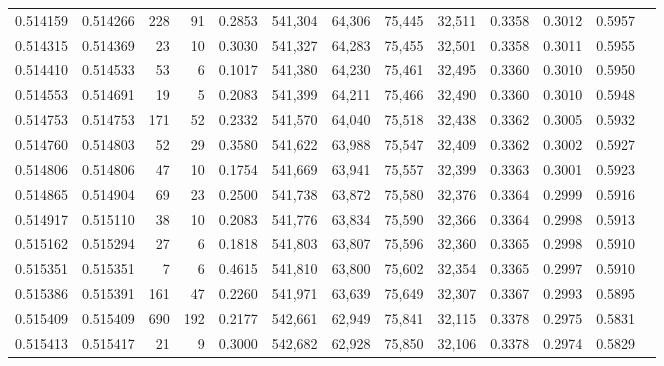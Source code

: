 \begin{tabular}{rrrrrrrrrrrrr}
0.514159 & 0.514266 &   228 &    91 &                                     0.2853 & 541,304 &  64,306 &  75,445 &  32,511 & 0.3358 & 0.3012 & 0.5957 \\
0.514315 & 0.514369 &    23 &    10 &                                     0.3030 & 541,327 &  64,283 &  75,455 &  32,501 & 0.3358 & 0.3011 & 0.5955 \\
0.514410 & 0.514533 &    53 &     6 &                                     0.1017 & 541,380 &  64,230 &  75,461 &  32,495 & 0.3360 & 0.3010 & 0.5950 \\
0.514553 & 0.514691 &    19 &     5 &                                     0.2083 & 541,399 &  64,211 &  75,466 &  32,490 & 0.3360 & 0.3010 & 0.5948 \\
0.514753 & 0.514753 &   171 &    52 &                                     0.2332 & 541,570 &  64,040 &  75,518 &  32,438 & 0.3362 & 0.3005 & 0.5932 \\
0.514760 & 0.514803 &    52 &    29 &                                     0.3580 & 541,622 &  63,988 &  75,547 &  32,409 & 0.3362 & 0.3002 & 0.5927 \\
0.514806 & 0.514806 &    47 &    10 &                                     0.1754 & 541,669 &  63,941 &  75,557 &  32,399 & 0.3363 & 0.3001 & 0.5923 \\
0.514865 & 0.514904 &    69 &    23 &                                     0.2500 & 541,738 &  63,872 &  75,580 &  32,376 & 0.3364 & 0.2999 & 0.5916 \\
0.514917 & 0.515110 &    38 &    10 &                                     0.2083 & 541,776 &  63,834 &  75,590 &  32,366 & 0.3364 & 0.2998 & 0.5913 \\
0.515162 & 0.515294 &    27 &     6 &                                     0.1818 & 541,803 &  63,807 &  75,596 &  32,360 & 0.3365 & 0.2998 & 0.5910 \\
0.515351 & 0.515351 &     7 &     6 &                                     0.4615 & 541,810 &  63,800 &  75,602 &  32,354 & 0.3365 & 0.2997 & 0.5910 \\
0.515386 & 0.515391 &   161 &    47 &                                     0.2260 & 541,971 &  63,639 &  75,649 &  32,307 & 0.3367 & 0.2993 & 0.5895 \\
0.515409 & 0.515409 &   690 &   192 &                                     0.2177 & 542,661 &  62,949 &  75,841 &  32,115 & 0.3378 & 0.2975 & 0.5831 \\
0.515413 & 0.515417 &    21 &     9 &                                     0.3000 & 542,682 &  62,928 &  75,850 &  32,106 & 0.3378 & 0.2974 & 0.5829 \\

\end{tabular}
